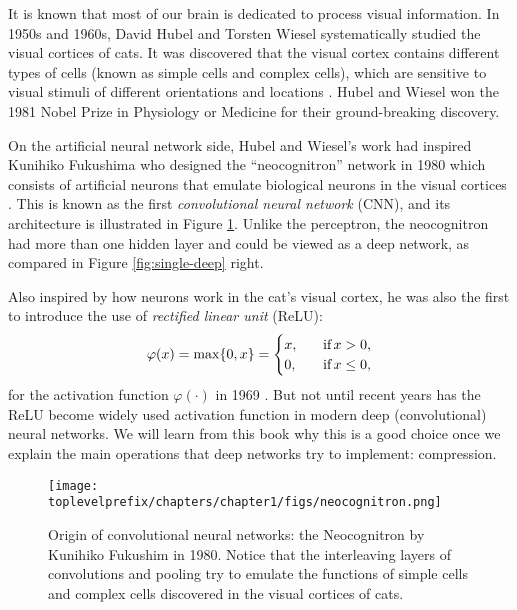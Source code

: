 \documentclass[\toplevelprefix/book-main.tex]{subfiles}
\begin{document}
It is known that most of our brain is dedicated to process visual information. In 1950s and 1960s, David Hubel and Torsten Wiesel systematically studied the visual cortices of cats. It was discovered that the visual cortex contains different types of cells (known as simple cells and complex cells), which are sensitive to visual stimuli of different orientations and locations \cite{Hubel-Wiesel-1959}. Hubel and Wiesel won the 1981 Nobel Prize in Physiology or Medicine for their ground-breaking discovery. 


On the artificial neural network side, Hubel and Wiesel's work had inspired Kunihiko Fukushima who  designed the ``neocognitron'' network in 1980 which consists of artificial neurons that emulate biological neurons in the visual cortices \cite{Fukushima1980NeocognitronAS}. This is known as the first {\em convolutional neural network} (CNN), and its architecture is illustrated in Figure \ref{fig:neocognitron}. Unlike the perceptron, the neocognitron had more than one hidden layer and could be viewed as a deep network, as compared in Figure \ref{fig:single-deep} right.

Also inspired by how neurons work in the cat's visual cortex, he was also the first to introduce the use of {\em rectified linear unit} (ReLU):
\begin{equation}
    \varphi(x) = \max\{0, x\} = \begin{cases}x, & \text{if} \, x > 0, \\ 0, \quad & \text{if} \, x \leq 0,\end{cases}
\end{equation}
for the activation function $\varphi(\cdot)$ in 1969 \cite{Fukushima-1969}. But not until recent years has the ReLU become widely used activation function in modern deep (convolutional) neural networks. We will learn from this book why this is a good choice once we explain the main operations that deep networks try to implement: compression. 

\begin{figure}
    \centering
    \texttt{[image: \\toplevelprefix/chapters/chapter1/figs/neocognitron.png]}
    \caption{Origin of convolutional neural networks: the Neocognitron by Kunihiko Fukushim in 1980. Notice that the interleaving layers of convolutions and pooling try to emulate the functions of simple cells and complex cells discovered in the visual cortices of cats.}
    \label{fig:neocognitron}
\end{figure}
\end{document}
